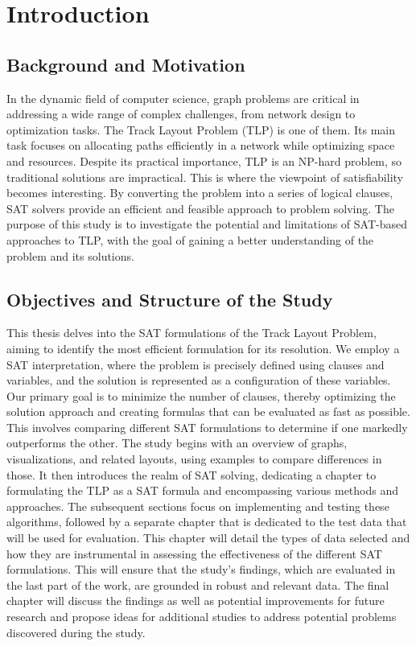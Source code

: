 \documentclass[bachelor, english]{algothesis}
\begin{document}
\thesistableofcontents

\chapter{Introduction}

\section{Background and Motivation}
\frenchspacing
In the dynamic field of computer science, graph problems are critical in addressing a wide range of complex challenges, from network design to optimization tasks. The Track Layout Problem (TLP) is one of them. Its main task focuses on allocating paths efficiently in a network while optimizing space and resources. Despite its practical importance, TLP is an NP-hard problem, so traditional solutions are impractical. This is where the viewpoint of satisfiability becomes interesting. By converting the problem into a series of logical clauses, SAT solvers provide an efficient and feasible approach to problem solving. The purpose of this study is to investigate the potential and limitations of SAT-based approaches to TLP, with the goal of gaining a better understanding of the problem and its solutions.

\section{Objectives and Structure of the Study}
\frenchspacing
This thesis delves into the SAT formulations of the Track Layout Problem, aiming to identify the most efficient formulation for its resolution. We employ a SAT interpretation, where the problem is precisely defined using clauses and variables, and the solution is represented as a configuration of these variables. Our primary goal is to minimize the number of clauses, thereby optimizing the solution approach and creating formulas that can be evaluated as fast as possible. This involves comparing different SAT formulations to determine if one markedly outperforms the other. 
\newline
The study begins with an overview of graphs, visualizations, and related layouts, using examples to compare differences in those. It then introduces the realm of SAT solving, dedicating a chapter to formulating the TLP as a SAT formula and encompassing various methods and approaches. The subsequent sections focus on implementing and testing these algorithms, followed by a separate chapter that is dedicated to the test data that will be used for evaluation. This chapter will detail the types of data selected and how they are instrumental in assessing the effectiveness of the different SAT formulations. This will ensure that the study's findings, which are evaluated in the last part of the work, are grounded in robust and relevant data. The final chapter will discuss the findings as well as potential improvements for future research and propose ideas for additional studies to address potential problems discovered during the study.
\end{document}
